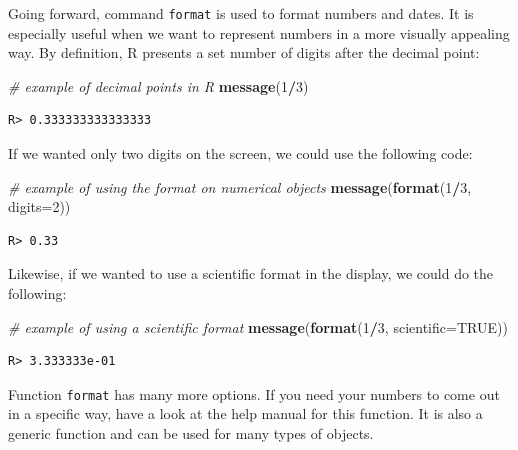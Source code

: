 \documentclass[
  12pt,
]{book}
\newenvironment{Shaded}{\begin{snugshade}}{\end{snugshade}}
\newcommand{\CommentTok}[1]{\textcolor[rgb]{0.37,0.37,0.37}{\textit{#1}}}
\newcommand{\DataTypeTok}[1]{\textcolor[rgb]{0.27,0.27,0.27}{#1}}
\newcommand{\DecValTok}[1]{\textcolor[rgb]{0.06,0.06,0.06}{#1}}
\newcommand{\KeywordTok}[1]{\textcolor[rgb]{0.27,0.27,0.27}{\textbf{#1}}}
\newcommand{\NormalTok}[1]{#1}
\newcommand{\OperatorTok}[1]{\textcolor[rgb]{0.43,0.43,0.43}{\textbf{#1}}}
\newcommand{\OtherTok}[1]{\textcolor[rgb]{0.37,0.37,0.37}{#1}}
\begin{document}
Going forward, command \texttt{format} is used to format numbers and dates. It is especially useful when we want to represent numbers in a more visually appealing way. By definition, R presents a set number of digits after the decimal point: 

\begin{Shaded}
\begin{Highlighting}[]
\CommentTok{# example of decimal points in R}
\KeywordTok{message}\NormalTok{(}\DecValTok{1}\OperatorTok{/}\DecValTok{3}\NormalTok{)}
\end{Highlighting}
\end{Shaded}

\begin{verbatim}
R> 0.333333333333333
\end{verbatim}

If we wanted only two digits on the screen, we could use the following code:

\begin{Shaded}
\begin{Highlighting}[]
\CommentTok{# example of using the format on numerical objects}
\KeywordTok{message}\NormalTok{(}\KeywordTok{format}\NormalTok{(}\DecValTok{1}\OperatorTok{/}\DecValTok{3}\NormalTok{, }\DataTypeTok{digits=}\DecValTok{2}\NormalTok{))}
\end{Highlighting}
\end{Shaded}

\begin{verbatim}
R> 0.33
\end{verbatim}

Likewise, if we wanted to use a scientific format in the display, we could do the following:

\begin{Shaded}
\begin{Highlighting}[]
\CommentTok{# example of using a scientific format}
\KeywordTok{message}\NormalTok{(}\KeywordTok{format}\NormalTok{(}\DecValTok{1}\OperatorTok{/}\DecValTok{3}\NormalTok{, }\DataTypeTok{scientific=}\OtherTok{TRUE}\NormalTok{))}
\end{Highlighting}
\end{Shaded}

\begin{verbatim}
R> 3.333333e-01
\end{verbatim}

Function \texttt{format} has many more options. If you need your numbers to come out in a specific way, have a look at the help manual for this function. It is also a generic function and can be used for many types of objects.
\end{document}
